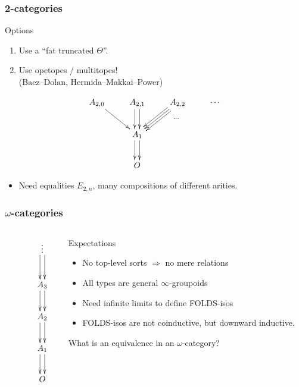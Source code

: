 \documentclass{beamer}
\begin{document}
\begin{frame}[t]
  \frametitle{2-categories}
  \begin{block}{Options}
    \begin{enumerate}
    \item Use a ``fat truncated $\Theta$''.
      \pause
    \item Use \alert{opetopes} / \alert{multitopes}! \\(Baez--Dolan, Hermida--Makkai--Power)
    \end{enumerate}
  \end{block}
  \[
  \vcenter{\xymatrix{
      A_{2,0} \ar[dr]
      & A_{2,1} \ar@<1mm>[d] \ar@<-1mm>[d]
      & A_{2,2} \ar@<1mm>[dl] \ar@<-1mm>[dl] \ar[dl]
      & \cdots \ar@{}[dll]|{\cdots} \\
      & A_1 \ar@<1mm>[d] \ar@<-1mm>[d] \\
      & O}}
  \]
  \begin{itemize}
  \item Need equalities $E_{2,n}$, many compositions of different arities.
  \end{itemize}
\end{frame}

\begin{frame}
  \frametitle{$\omega$-categories}
  \begin{columns}
    \begin{column}{2cm}
      \[
      \vcenter{\xymatrix{
          & \vdots \ar@<1mm>[d] \ar@<-1mm>[d] \\
          & A_3 \ar@<1mm>[d] \ar@<-1mm>[d] \\
          & A_2 \ar@<1mm>[d] \ar@<-1mm>[d] \\
          & A_1 \ar@<1mm>[d] \ar@<-1mm>[d] \\
          & O}}
      \]
    \end{column}
    \begin{column}{8cm}
      \begin{block}{Expectations}
        \begin{itemize}
        \item No top-level sorts $\Rightarrow$ no mere relations
        \item All types are general $\infty$-groupoids
        \item Need infinite limits to define FOLDS-isos
          \pause
        \item FOLDS-isos are \alert{not} coinductive, but downward inductive.
        \end{itemize}
      \end{block}
      What is an equivalence in an $\omega$-category?
    \end{column}
  \end{columns}
\end{frame}
\end{document}

